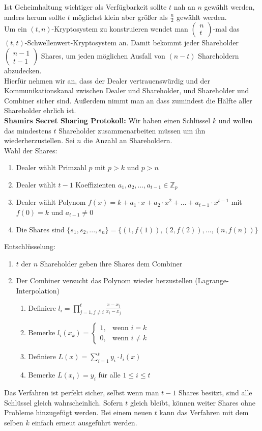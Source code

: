 \documentclass[a4paper,12pt,leqno]{article}
\begin{document}
Ist Geheimhaltung wichtiger als Verfügbarkeit sollte $t$ nah an $n$ gewählt werden, anders herum sollte $t$ möglichst klein aber größer als $\frac{n}{2}$ gewählt werden.\\
Um ein $(t,n)$-Kryptosystem zu konstruieren wendet man $\begin{pmatrix}n\\t\end{pmatrix}$-mal das $(t,t)$-Schwellenwert-Kryptosystem an. Damit bekommt jeder Shareholder $\begin{pmatrix}n-1\\t-1\end{pmatrix}$ Shares, um jeden möglichen Ausfall von $(n-t)$ Shareholdern abzudecken.\\
Hierfür nehmen wir an, dass der Dealer vertrauenswürdig und der Kommunikationskanal zwischen Dealer und Shareholder, und Shareholder und Combiner sicher sind. Außerdem nimmt man an dass zumindest die Hälfte aller Shareholder ehrlich ist.\\

\textbf{Shamirs Secret Sharing Protokoll:}
Wir haben einen Schlüssel $k$ und wollen das mindestens $t$ Shareholder zusammenarbeiten müssen um ihn wiederherzustellen. Sei $n$ die Anzahl an Shareholdern.\\
Wahl der Shares:
\begin{enumerate}
\item Dealer wählt Primzahl $p$ mit $p>k$ und $p>n$
\item Dealer wählt $t-1$ Koeffizienten $a_1,a_2,...,a_{t-1}\in \mathbb{Z}_p$
\item Dealer wählt Polynom $f(x)=k+a_1\cdot x+a_2\cdot x^2+...+a_{t-1}\cdot x^{t-1}$ mit $f(0)=k$ und $a_{t-1}\neq 0$
\item Die Shares sind $\{s_1,s_2,...,s_n\}=\{(1,f(1)),(2,f(2)),...,(n,f(n))\}$
\end{enumerate}
Entschlüsselung:
\begin{enumerate}
\item $t$ der $n$ Shareholder geben ihre Shares dem Combiner
\item Der Combiner versucht das Polynom wieder herzustellen (Lagrange-Interpolation)
	\begin{enumerate}
	\item Definiere $l_i=\prod_{j=1,j\neq i}^t\frac{x-x_j}{x_i-x_j}$
	\item Bemerke $l_i(x_k)=\left\lbrace\begin{array}{lr}1,&\textrm{wenn }i=k\\0,&\textrm{wenn }i\neq k\end{array}\right.$
	\item Definiere $L(x)=\sum_{i=1}^ty_i\cdot l_i(x)$
	\item Bemerke $L(x_i)=y_i$ für alle $1\leq i\leq t$
	\end{enumerate}
\end{enumerate}
Das Verfahren ist perfekt sicher, selbst wenn man $t-1$ Shares besitzt, sind alle Schlüssel gleich wahrscheinlich. Sofern $t$ gleich bleibt, können weiter Shares ohne Probleme hinzugefügt werden. Bei einem neuen $t$ kann das Verfahren mit dem selben $k$ einfach erneut ausgeführt werden.
\end{document}
